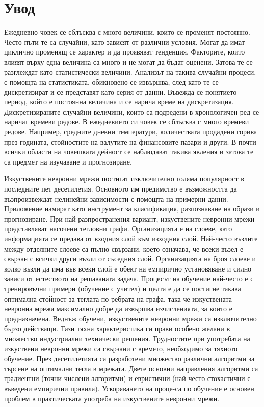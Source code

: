 \chapter*{Увод}

Ежедневно човек се сблъсква с много величини, които се променят постоянно. Често пъти те са случайни, като зависят от различни условия. Могат да имат циклично променящ се характер и да проявяват тенденция. Факторите, които влияят върху една величина са много и не могат да бъдат оценени. Затова те се разглеждат като статистически величини. Анализът на такива случайни процеси, с помощта на статистиката, обикновено се извършва, след като те се дискретизират и се представят като серия от данни. Въвежда се понятието период, който е постоянна величина и се нарича време на дискретизация. Дискретизираните случайни величини, които са подредени в хронологичен ред се наричат времеви редове. В ежедневието си човек се сблъсква с много времеви редове. Например, средните дневни температури, количествата продадени горива през годината, стойностите на валутите на финансовите пазари и други. В почти всички области на човешката дейност се наблюдават такива явления и затова те са предмет на изучаване и прогнозиране.

Изкуствените невронни мрежи постигат изключително голяма популярност в последните пет десетилетия. Основното им предимство е възможността да възпроизвеждат нелинейни зависимости с помощта на примерни данни. Приложение намират като инструмент за класификация, разпознаване на образи и прогнозиране. При най-разпространения вариант, изкуствените невронни мрежи представляват насочени тегловни графи. Организацията е на слоеве, като информацията се предава от входния слой към изходния слой. Най-често възлите между отделните слоеве са пълно свързани, което означава, че всеки възел е свързан с всички други възли от съседния слой. Организацията на броя слоеве и колко възли да има във всеки слой е обект на емпирично установяване и силно зависи от естеството на решаваната задача. Процесът на обучение най-често е с тренировъчни примери (обучение с учител) и целта е да се постигне такава оптимална стойност за теглата по ребрата на графа, така че изкуствената невронна мрежа максимално добре да извършва изчисленията, за които е предназначена. Веднъж обучени, изкуствените невронни мрежи са изключително бързо действащи. Тази тяхна характеристика ги прави особено желани в множество индустриални технически решения. Трудностите при употребата на изкуствени невронни мрежи са свързани с времето, необходимо за тяхното обучение. През десетилетията са разработени множество различни алгоритми за търсене на оптимални тегла в мрежата. Двете основни направления алгоритми са градиентни (точни числени алгоритми) и евристични (най-често стохастични с въведени емпирични правила). Ускоряването на проце-са по обучение е основен проблем в практическата употреба на изкуствените невронни мрежи.


